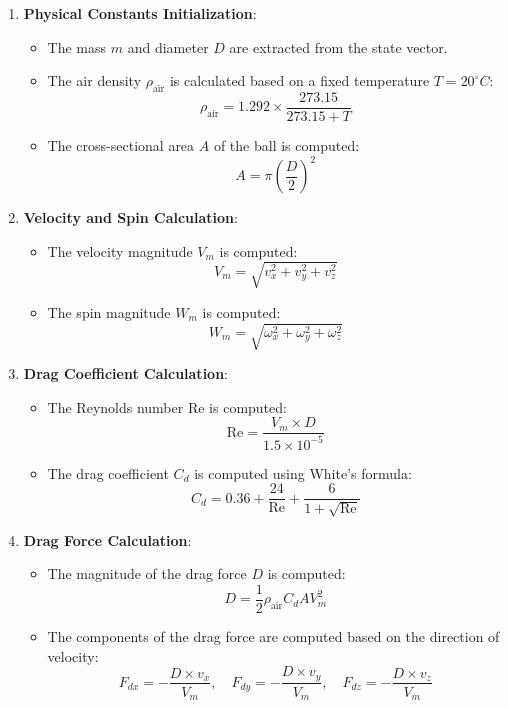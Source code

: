 \documentclass[10pt,a4paper]{report}
\begin{document}
\begin{enumerate}
    \item \textbf{Physical Constants Initialization}:
    \begin{itemize}
        \item The mass \(m\) and diameter \(D\) are extracted from the state vector.
        \item The air density \(\rho_{\text{air}}\) is calculated based on a fixed temperature \(T = 20^\circ C\):
        \[
        \rho_{\text{air}} = 1.292 \times \frac{273.15}{273.15 + T}
        \]
        \item The cross-sectional area \(A\) of the ball is computed:
        \[
        A = \pi \left(\frac{D}{2}\right)^2
        \]
    \end{itemize}

    \item \textbf{Velocity and Spin Calculation}:
    \begin{itemize}
        \item The velocity magnitude \(V_m\) is computed:
        \[
        V_m = \sqrt{v_x^2 + v_y^2 + v_z^2}
        \]
        \item The spin magnitude \(W_m\) is computed:
        \[
        W_m = \sqrt{\omega_x^2 + \omega_y^2 + \omega_z^2}
        \]
    \end{itemize}

    \item \textbf{Drag Coefficient Calculation}:
    \begin{itemize}
        \item The Reynolds number \(\text{Re}\) is computed:
        \[
        \text{Re} = \frac{V_m \times D}{1.5 \times 10^{-5}}
        \]
        \item The drag coefficient \(C_d\) is computed using White's formula:
        \[
        C_d = 0.36 + \frac{24}{\text{Re}} + \frac{6}{1 + \sqrt{\text{Re}}}
        \]
    \end{itemize}

    \item \textbf{Drag Force Calculation}:
    \begin{itemize}
        \item The magnitude of the drag force \(D\) is computed:
        \[
        D = \frac{1}{2} \rho_{\text{air}} C_d A V_m^2
        \]
        \item The components of the drag force are computed based on the direction of velocity:
        \[
        F_{dx} = -\frac{D \times v_x}{V_m}, \quad F_{dy} = -\frac{D \times v_y}{V_m}, \quad F_{dz} = -\frac{D \times v_z}{V_m}
        \]
    \end{itemize}


\end{enumerate}
\end{document}
